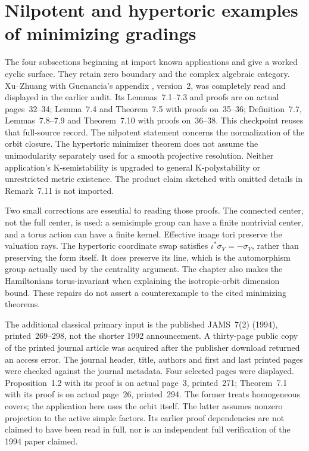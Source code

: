 \section{Nilpotent and hypertoric examples of minimizing gradings}
\label{sec:provenance-symplectic-examples}

The four subsections beginning at
 import known applications
and give a worked cyclic surface. They retain zero boundary and the
complex algebraic category. Xu--Zhuang with Guenancia's appendix
\cite{XuZhuang26StableFormsV2}, version~2, was completely read and
displayed in the earlier audit. Its Lemmas~7.1--7.3 and proofs are
on actual pages~32--34; Lemma~7.4 and Theorem~7.5 with proofs
on~35--36; Definition~7.7, Lemmas~7.8--7.9 and Theorem~7.10 with
proofs on~36--38. This checkpoint reuses that full-source record.
The nilpotent statement concerns the normalization of the orbit
closure. The hypertoric minimizer theorem does not assume the
unimodularity separately used for a smooth projective resolution.
Neither application's K-semistability is upgraded to general
K-polystability or unrestricted metric existence. The product
claim sketched with omitted details in Remark~7.11 is not imported.

Two small corrections are essential to reading those proofs.
The connected center, not the full center, is used: a semisimple
group can have a finite nontrivial center, and a torus action can
have a finite kernel. Effective image tori preserve the valuation
rays. The hypertoric coordinate swap satisfies
$\iota^*\sigma_Y=-\sigma_Y$, rather than preserving the form itself.
It does preserve its line, which is the automorphism group actually
used by the centrality argument. The chapter also makes the
Hamiltonians torus-invariant when explaining the isotropic-orbit
dimension bound. These repairs do not assert a counterexample to
the cited minimizing theorems.

The additional classical primary input
\cite{BrylinskiKostant94NilpotentPublished} is the published
JAMS~7(2) (1994), printed~269--298, not the shorter 1992
announcement. A thirty-page public copy of the printed journal
article was acquired after the publisher download returned an
access error. The journal header, title, authors and first and last
printed pages were checked against the journal metadata. Four
selected pages were displayed. Proposition~1.2 with its proof
is on actual page~3, printed~271; Theorem~7.1 with its proof is
on actual page~26, printed~294. The former treats homogeneous
covers; the application here uses the orbit itself. The latter
assumes nonzero projection to the active simple factors. Its
earlier proof dependencies are not claimed to have been read in
full, nor is an independent full verification of the 1994 paper
claimed.

